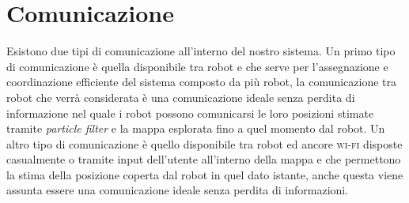 \section{Comunicazione}
Esistono due tipi di comunicazione all'interno del nostro sistema. Un primo tipo 
di comunicazione è quella disponibile tra robot e che serve per l'assegnazione
e coordinazione efficiente del sistema composto da più robot, la comunicazione
tra robot che verrà considerata è una comunicazione ideale senza perdita di 
informazione nel quale i robot possono comunicarsi le loro posizioni stimate 
tramite \emph{particle filter} e la mappa esplorata fino a quel momento dal 
robot. Un altro tipo di comunicazione è quello disponibile tra robot ed 
ancore \textsc{wi-fi} disposte casualmente o tramite input dell'utente all'interno 
della mappa e che permettono la stima della posizione coperta dal robot in 
quel dato istante, anche questa viene assunta essere una comunicazione 
ideale senza perdita di informazioni.